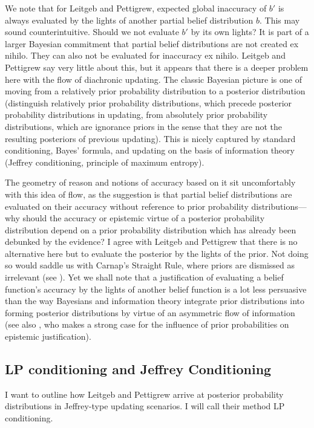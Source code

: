 \documentclass[phd,12pt,oneside]{ubcthesis}
\begin{document}
We note that for Leitgeb and Pettigrew, expected global inaccuracy of
$b'$ is always evaluated by the lights of another partial belief
distribution $b$. This may sound counterintuitive. Should we not
evaluate $b'$ by its own lights? It is part of a larger Bayesian
commitment that partial belief distributions are not created ex
nihilo. They can also not be evaluated for inaccuracy ex nihilo.
Leitgeb and Pettigrew say very little about this, but it appears that
there is a deeper problem here with the flow of diachronic updating.
The classic Bayesian picture is one of moving from a relatively prior
probability distribution to a posterior distribution (distinguish
relatively prior probability distributions, which precede posterior
probability distributions in updating, from absolutely prior
probability distributions, which are ignorance priors in the sense
that they are not the resulting posteriors of previous updating). This
is nicely captured by standard conditioning, Bayes' formula, and
updating on the basis of information theory (Jeffrey conditioning,
principle of maximum entropy).

The geometry of reason and notions of accuracy based on it sit
uncomfortably with this idea of flow, as the suggestion is that
partial belief distributions are evaluated on their accuracy without
reference to prior probability distributions---why should the
accuracy or epistemic virtue of a posterior probability distribution
depend on a prior probability distribution which has already been
debunked by the evidence? I agree with Leitgeb and Pettigrew that
there is no alternative here but to evaluate the posterior by the
lights of the prior. Not doing so would saddle us with Carnap's
Straight Rule, where priors are dismissed as irrelevant (see
). Yet we shall note that a justification of
evaluating a belief function's accuracy by the lights of another
belief function is a lot less persuasive than the way Bayesians and
information theory integrate prior distributions into forming
posterior distributions by virtue of an asymmetric flow of
information (see also , who makes a strong case
for the influence of prior probabilities on epistemic justification).

\subsection{LP conditioning and Jeffrey Conditioning}
\label{subsec:meexughi}

I want to outline how Leitgeb and Pettigrew arrive at posterior
probability distributions in Jeffrey-type updating scenarios. I will
call their method LP conditioning.
\end{document}
